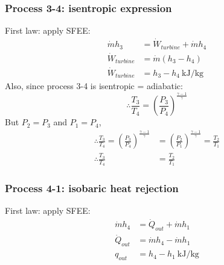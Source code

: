 \documentclass[class=report, crop=false, 12pt,a4paper]{standalone}
\begin{document}
\subsubsection{Process 3-4: isentropic expression}
First law: apply SFEE:
\begin{align}
  \dot{m} h_3 &= \dot{W}_{turbine} + \dot{m} h_4\\
  \dot{W}_{turbine} &= \dot{m} (h_3 - h_4)\\
  \dot{W}_{turbine} &= h_3 - h_4 \ \si{\kilo\joule\per\kg}
\end{align}
Also, since process 3-4 is isentropic = adiabatic:
\begin{equation}
  \therefore \frac{T_3}{T_4} = \left( \frac{P_3}{P_4} \right)^{\frac{\gamma -1}{\gamma}}
\end{equation}
But $P_2 = P_3$ and $P_1 = P_4$,
\begin{align}
  \therefore \frac{T_3}{T_4} = \left( \frac{P_3}{P_4} \right)^{\frac{\gamma -1}{\gamma}} &= \left( \frac{P_2}{P_1} \right)^{\frac{\gamma -1}{\gamma}} = \frac{T_2}{T_1}\\
  \therefore \frac{T_3}{T_4} &= \frac{T_2}{T_1}
\end{align}
\subsubsection{Process 4-1: isobaric heat rejection}
First law: apply SFEE:
\begin{align}
  \dot{m} h_4 &= \dot{Q}_{out} + \dot{m} h_1\\
  \dot{Q}_{out} &= \dot{m} h_4 - \dot{m} h_1\\
  q_{out} &= h_4 - h_1 \ \si{\kilo\joule\per\kg}
\end{align}
\end{document}
